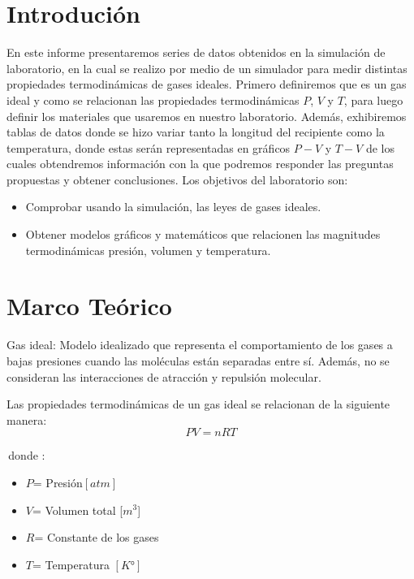 \documentclass[a4paper, 12p]{article}
\begin{document}
\tableofcontents

\section{Introdución}
En este informe presentaremos series de datos obtenidos en la simulación de laboratorio, en la cual se realizo por medio de un simulador para medir distintas propiedades termodinámicas de gases ideales.
 Primero definiremos que es un gas ideal y como se relacionan las propiedades termodinámicas $P$, $V$ y $T$, para luego definir los materiales que usaremos en nuestro laboratorio.
Además, exhibiremos tablas de datos donde se hizo variar tanto la longitud del recipiente como la temperatura, donde estas serán representadas en gráficos $P-V$ y $T-V$ de los cuales obtendremos información con la que podremos responder las preguntas propuestas y obtener conclusiones.
Los objetivos del laboratorio son:
 \begin{itemize}  %
      \item Comprobar usando la simulación, las leyes de gases ideales.
      \item Obtener modelos gráficos y matemáticos que relacionen las magnitudes termodinámicas presión,
      volumen y temperatura.
\end{itemize}


\section{Marco Teórico}

Gas ideal: Modelo idealizado que representa el comportamiento 
de los gases a bajas presiones cuando  las moléculas están separadas entre sí. Además, no se
consideran las interacciones de atracción y repulsión molecular.


Las propiedades termodinámicas de un gas ideal se relacionan de la siguiente manera:
\begin{equation*}
      PV=nRT
\end{equation*}

\,donde :
\begin{itemize}
      \item $P$= Presión$[atm]$
      \item $V$= Volumen total [$m^3$]
      \item $R$= Constante de los gases
      \item $T$= Temperatura $[K°]$
\end{itemize}
\end{document}
